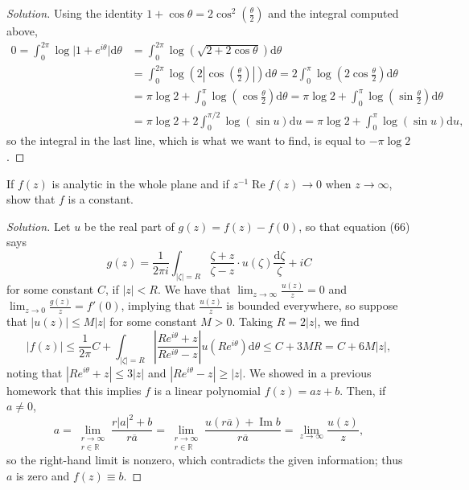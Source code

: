 \documentclass[10pt]{article}
\providecommand{\ol}{\overline}
\newcommand{\dd}{\mathrm{d}}
\providecommand{\RR}{\mathbb R}
\providecommand{\inv}{^{-1}}
\newenvironment{soln}{\begin{proof}[Solution]}{\end{proof}}
\providecommand{\abs}[1]{\left\lvert #1\right\rvert}
\providecommand{\smabs}[1]{\lvert #1\rvert}
\providecommand{\paren}[1]{\left(#1\right)}
\begin{document}
\begin{soln}
    Using the identity $1 + \cos\theta = 2\cos^2(\frac\theta2)$
    and the integral computed above,
    \begin{align*}
	0 =\int_0^{2\pi} \log\smabs{1 + e^{i\theta}}\dd\theta
	&= \int_0^{2\pi}\log(\sqrt{2 + 2\cos\theta})\dd\theta\\
	&= \int_0^{2\pi}\log
	\paren{2\abs{\cos\paren{\frac\theta2}}}\dd\theta
	= 2\int_0^{\pi}\log\paren{2\cos\frac\theta2}
	\dd\theta\\
	&= \pi\log 2 +
	\int_0^\pi\log\paren{\cos\frac\theta2}\dd\theta
	= \pi\log 2 + \int_0^{\pi}\log\paren{\sin\frac\theta2}\dd\theta\\
	&= \pi\log2 + 2\int_0^{\pi/2}\log(\sin u)\dd u
	= \pi\log2 + \int_0^{\pi}\log(\sin u)\dd u,
    \end{align*}
    so the integral in the last line,
    which is what we want to find, is equal to $\boxed{-\pi\log 2}$.
\end{soln}

\begin{problem}
    [p.171\#6]
    If $f(z)$ is analytic in the whole plane and if
    $z\inv\operatorname{Re}f(z)\to 0$ when $z\to\infty$,
    show that $f$ is a constant.
\end{problem}

\begin{soln}
    Let $u$ be the real part of $g(z) = f(z) - f(0)$,
    so that equation (66) says
    \begin{equation*}
	g(z) = \frac 1{2\pi i}\int_{\abs\zeta = R}
	\frac{\zeta + z}{\zeta - z}\cdot u(\zeta)\frac{\dd\zeta}{\zeta}
	+ iC
    \end{equation*}
    for some constant $C$, if $\abs z < R$.
    We have that $\lim_{z\to \infty}\frac{u(z)}{z} = 0$
    and $\lim_{z\to 0} \frac{g(z)}{z} = f'(0)$,
    implying that $\frac{u(z)}{z}$ is bounded everywhere,
    so suppose that $\abs{u(z)} \le M\abs z$ for some constant $M > 0$.
    Taking $R = 2\abs z$, we find
    \begin{equation*}
	\abs{f(z)} \le \frac 1{2\pi}
	C + \int_{\abs\zeta = R}
	\abs{\frac{Re^{i\theta} + z}{Re^{i\theta} - z}}
	u(Re^{i\theta})\dd\theta
	\le C + 3MR = C + 6M\abs z,
    \end{equation*}
    noting that $\abs{Re^{i\theta} + z} \le 3\abs z$
    and $\abs{Re^{i\theta} - z} \ge \abs z$.
    We showed in a previous homework that this implies
    $f$ is a linear polynomial $f(z) = az + b$. Then, if $a\ne 0$,
    \begin{equation*}
	a
	= \lim_{\substack{r\to\infty\\r\in\RR}} \frac{r\abs a^2 + b}{r\ol a}
	= \lim_{\substack{r\to\infty\\r\in\RR}} \frac{u(r\ol a) +
	\operatorname{Im}b}{r\ol a}
	= \lim_{z\to\infty} \frac{u(z)}{z},
    \end{equation*}
    so the right-hand limit is nonzero,
    which contradicts the given information;
    thus $a$ is zero and $f(z)\equiv b$.
\end{soln}
\end{document}

